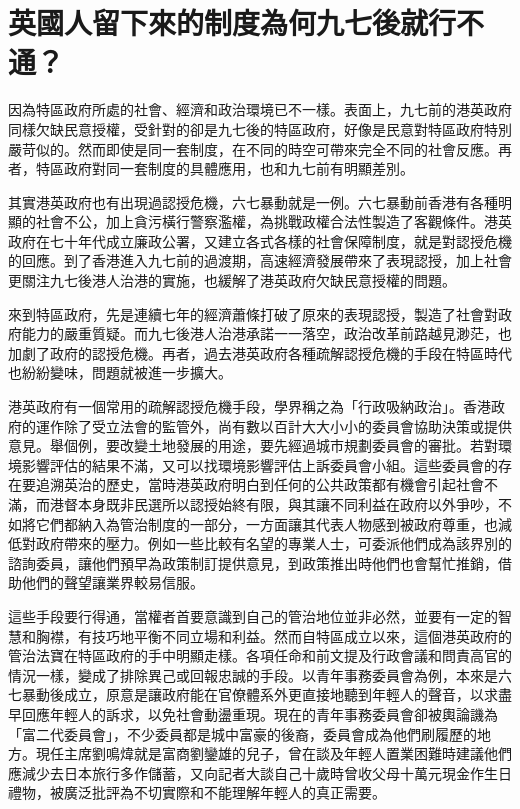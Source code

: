 \section{英國人留下來的制度為何九七後就行不通？}

因為特區政府所處的社會、經濟和政治環境已不一樣。表面上，九七前的港英政府同樣欠缺民意授權，受針對的卻是九七後的特區政府，好像是民意對特區政府特別嚴苛似的。然而即使是同一套制度，在不同的時空可帶來完全不同的社會反應。再者，特區政府對同一套制度的具體應用，也和九七前有明顯差別。

其實港英政府也有出現過認授危機，六七暴動就是一例。六七暴動前香港有各種明顯的社會不公，加上貪污橫行警察濫權，為挑戰政權合法性製造了客觀條件。港英政府在七十年代成立廉政公署，又建立各式各樣的社會保障制度，就是對認授危機的回應。到了香港進入九七前的過渡期，高速經濟發展帶來了表現認授，加上社會更關注九七後港人治港的實施，也緩解了港英政府欠缺民意授權的問題。

來到特區政府，先是連續七年的經濟蕭條打破了原來的表現認授，製造了社會對政府能力的嚴重質疑。而九七後港人治港承諾一一落空，政治改革前路越見渺茫，也加劇了政府的認授危機。再者，過去港英政府各種疏解認授危機的手段在特區時代也紛紛變味，問題就被進一步擴大。

港英政府有一個常用的疏解認授危機手段，學界稱之為「行政吸納政治」。香港政府的運作除了受立法會的監管外，尚有數以百計大大小小的委員會協助決策或提供意見。舉個例，要改變土地發展的用途，要先經過城市規劃委員會的審批。若對環境影響評估的結果不滿，又可以找環境影響評估上訴委員會小組。這些委員會的存在要追溯英治的歷史，當時港英政府明白到任何的公共政策都有機會引起社會不滿，而港督本身既非民選所以認授始終有限，與其讓不同利益在政府以外爭吵，不如將它們都納入為管治制度的一部分，一方面讓其代表人物感到被政府尊重，也減低對政府帶來的壓力。例如一些比較有名望的專業人士，可委派他們成為該界別的諮詢委員，讓他們預早為政策制訂提供意見，到政策推出時他們也會幫忙推銷，借助他們的聲望讓業界較易信服。

這些手段要行得通，當權者首要意識到自己的管治地位並非必然，並要有一定的智慧和胸襟，有技巧地平衡不同立場和利益。然而自特區成立以來，這個港英政府的管治法寶在特區政府的手中明顯走樣。各項任命和前文提及行政會議和問責高官的情況一樣，變成了排除異己或回報忠誠的手段。以青年事務委員會為例，本來是六七暴動後成立，原意是讓政府能在官僚體系外更直接地聽到年輕人的聲音，以求盡早回應年輕人的訴求，以免社會動盪重現。現在的青年事務委員會卻被輿論譏為「富二代委員會」，不少委員都是城中富豪的後裔，委員會成為他們刷履歷的地方。現任主席劉鳴煒就是富商劉鑾雄的兒子，曾在談及年輕人置業困難時建議他們應減少去日本旅行多作儲蓄，又向記者大談自己十歲時曾收父母十萬元現金作生日禮物，被廣泛批評為不切實際和不能理解年輕人的真正需要。

